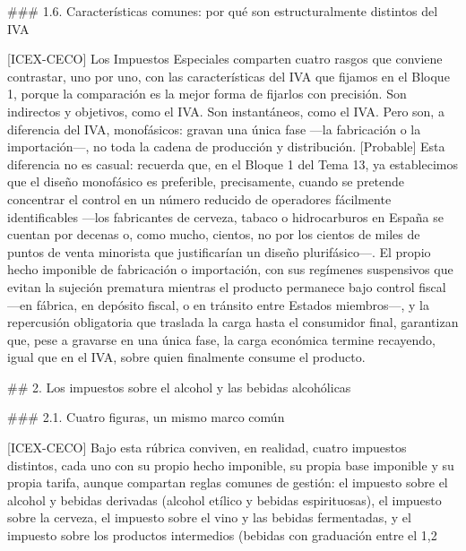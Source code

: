 \documentclass[10pt,a4paper]{article}
\begin{document}
### 1.6. Características comunes: por qué son estructuralmente distintos del IVA

[ICEX-CECO] Los Impuestos Especiales comparten cuatro rasgos que conviene contrastar, uno por uno, con las características del IVA que fijamos en el Bloque 1, porque la comparación es la mejor forma de fijarlos con precisión. Son indirectos y objetivos, como el IVA. Son instantáneos, como el IVA. Pero son, a diferencia del IVA, monofásicos: gravan una única fase —la fabricación o la importación—, no toda la cadena de producción y distribución. [Probable] Esta diferencia no es casual: recuerda que, en el Bloque 1 del Tema 13, ya establecimos que el diseño monofásico es preferible, precisamente, cuando se pretende concentrar el control en un número reducido de operadores fácilmente identificables —los fabricantes de cerveza, tabaco o hidrocarburos en España se cuentan por decenas o, como mucho, cientos, no por los cientos de miles de puntos de venta minorista que justificarían un diseño plurifásico—. El propio hecho imponible de fabricación o importación, con sus regímenes suspensivos que evitan la sujeción prematura mientras el producto permanece bajo control fiscal —en fábrica, en depósito fiscal, o en tránsito entre Estados miembros—, y la repercusión obligatoria que traslada la carga hasta el consumidor final, garantizan que, pese a gravarse en una única fase, la carga económica termine recayendo, igual que en el IVA, sobre quien finalmente consume el producto.


## 2. Los impuestos sobre el alcohol y las bebidas alcohólicas

### 2.1. Cuatro figuras, un mismo marco común

[ICEX-CECO] Bajo esta rúbrica conviven, en realidad, cuatro impuestos distintos, cada uno con su propio hecho imponible, su propia base imponible y su propia tarifa, aunque compartan reglas comunes de gestión: el impuesto sobre el alcohol y bebidas derivadas (alcohol etílico y bebidas espirituosas), el impuesto sobre la cerveza, el impuesto sobre el vino y las bebidas fermentadas, y el impuesto sobre los productos intermedios (bebidas con graduación entre el 1,2%
\end{document}
